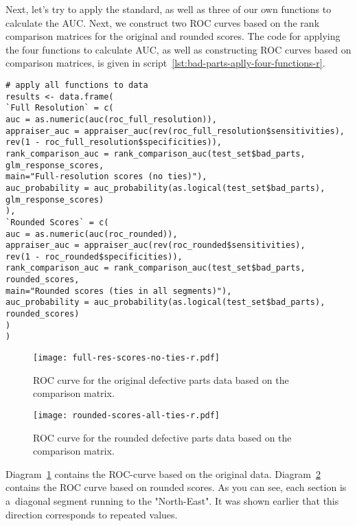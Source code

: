 \documentclass[]{scrreprt}
\begin{document}
Next, let's try to apply the standard, as well as three of our own functions to calculate the AUC. Next, we construct two ROC curves based on the rank comparison matrices for the original and rounded scores. The code for applying the four functions to calculate AUC, as well as constructing ROC curves based on comparison matrices, is given in script~\ref{lst:bad-parts-aplly-four-functions-r}.
%
\begin{lstlisting}[float, caption = Using four functions to calculate AUC and plot ROC curves based on comparison matrices for original and rounded scores, firstnumber=1, label= lst:bad-parts-aplly-four-functions-r]
# apply all functions to data
results <- data.frame(
`Full Resolution` = c(
auc = as.numeric(auc(roc_full_resolution)),
appraiser_auc = appraiser_auc(rev(roc_full_resolution$sensitivities),
rev(1 - roc_full_resolution$specificities)),
rank_comparison_auc = rank_comparison_auc(test_set$bad_parts,
glm_response_scores, 
main="Full-resolution scores (no ties)"),
auc_probability = auc_probability(as.logical(test_set$bad_parts),
glm_response_scores)
),
`Rounded Scores` = c( 
auc = as.numeric(auc(roc_rounded)),
appraiser_auc = appraiser_auc(rev(roc_rounded$sensitivities),
rev(1 - roc_rounded$specificities)),
rank_comparison_auc = rank_comparison_auc(test_set$bad_parts, rounded_scores,
main="Rounded scores (ties in all segments)"),
auc_probability = auc_probability(as.logical(test_set$bad_parts),
rounded_scores)
)
)
\end{lstlisting}
%
\begin{figure}[htp]
	\centering
	\texttt{[image: full-res-scores-no-ties-r.pdf]}
	\caption{ROC curve for the original defective parts data based on the comparison matrix.}
	\label{fig:bad-parts-ROC-original-r}
\end{figure}
%
\begin{figure}[htp]
	\centering
	\texttt{[image: rounded-scores-all-ties-r.pdf]}
	\caption{ROC curve for the rounded defective parts data based on the comparison matrix.}
	\label{fig:bad-parts-ROC-rounded-r}
\end{figure}
%

Diagram~\ref{fig:bad-parts-ROC-original-r} contains the ROC-curve based on the original data. Diagram~\ref{fig:bad-parts-ROC-rounded-r} contains the ROC curve based on rounded scores. As you can see, each section is a~diagonal segment running to the "North-East". It was shown earlier that this direction corresponds to repeated values.
\end{document}
